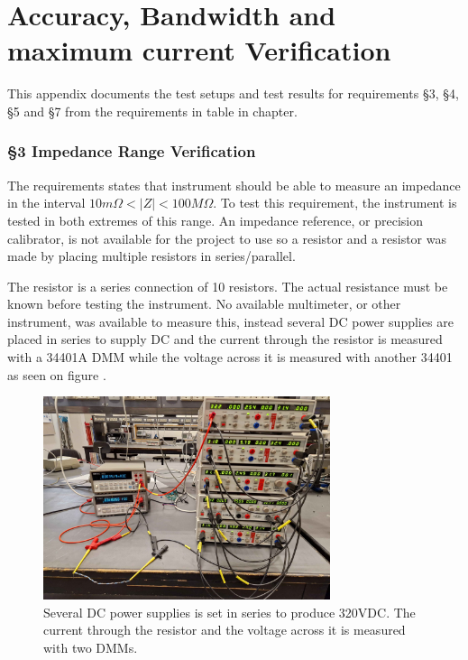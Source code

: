 \chapter{Accuracy, Bandwidth and maximum current Verification} \label{App:AccuracyBWTest}
This appendix documents the test setups and test results for requirements §3, §4, §5 and §7 from the requirements in table  in chapter.

\subsection{§3 Impedance Range Verification} \label{subsec:ZRangeVerify} 
The requirements states that instrument should be able to measure an impedance in the interval $10m\Omega < |Z| < 100M \Omega$. To test this requirement, the instrument is tested in both extremes of this range. An impedance reference, or precision calibrator, is not available for the project to use so a  resistor and a  resistor was made by placing multiple resistors in series/parallel.


The  resistor is a series connection of 10  resistors. The actual resistance must be known before testing the instrument. No available multimeter, or other instrument, was available to measure this, instead several DC power supplies are placed in series to supply DC and the current through the resistor is measured with a 34401A DMM while the voltage across it is measured with another 34401 as seen on figure .

\begin{figure}[H]
    \centering
    \includegraphics[clip, trim=0 0 0 0, width=0.75\textwidth]{Appendix/Figures/A_Z_100MegSetup.pdf}
    \caption{Several DC power supplies is set in series to produce 320VDC. The current through the resistor and the voltage across it is measured with two DMMs.}
    \label{fig:App_A_Z_100MEGSetup}
\end{figure}

